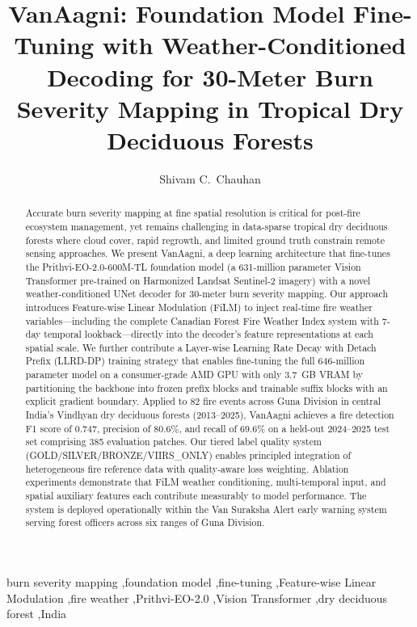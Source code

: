 \documentclass[review,12pt]{elsarticle}
\begin{document}
\begin{frontmatter}

\title{VanAagni: Foundation Model Fine-Tuning with Weather-Conditioned Decoding for 30-Meter Burn Severity Mapping in Tropical Dry Deciduous Forests}

\author[guna]{Shivam C.\ Chauhan}


\begin{abstract}
Accurate burn severity mapping at fine spatial resolution is critical for post-fire ecosystem management, yet remains challenging in data-sparse tropical dry deciduous forests where cloud cover, rapid regrowth, and limited ground truth constrain remote sensing approaches. We present VanAagni, a deep learning architecture that fine-tunes the Prithvi-EO-2.0-600M-TL foundation model (a 631-million parameter Vision Transformer pre-trained on Harmonized Landsat Sentinel-2 imagery) with a novel weather-conditioned UNet decoder for 30-meter burn severity mapping. Our approach introduces Feature-wise Linear Modulation (FiLM) to inject real-time fire weather variables---including the complete Canadian Forest Fire Weather Index system with 7-day temporal lookback---directly into the decoder's feature representations at each spatial scale. We further contribute a Layer-wise Learning Rate Decay with Detach Prefix (LLRD-DP) training strategy that enables fine-tuning the full 646-million parameter model on a consumer-grade AMD GPU with only 3.7~GB VRAM by partitioning the backbone into frozen prefix blocks and trainable suffix blocks with an explicit gradient boundary. Applied to 82 fire events across Guna Division in central India's Vindhyan dry deciduous forests (2013--2025), VanAagni achieves a fire detection F1 score of 0.747, precision of 80.6\%, and recall of 69.6\% on a held-out 2024--2025 test set comprising 385 evaluation patches. Our tiered label quality system (GOLD/SILVER/BRONZE/VIIRS\_ONLY) enables principled integration of heterogeneous fire reference data with quality-aware loss weighting. Ablation experiments demonstrate that FiLM weather conditioning, multi-temporal input, and spatial auxiliary features each contribute measurably to model performance. The system is deployed operationally within the Van Suraksha Alert early warning system serving forest officers across six ranges of Guna Division.
\end{abstract}

\begin{keyword}
burn severity mapping \sep foundation model \sep fine-tuning \sep Feature-wise Linear Modulation \sep fire weather \sep Prithvi-EO-2.0 \sep Vision Transformer \sep dry deciduous forest \sep India
\end{keyword}

\end{frontmatter}
\end{document}
